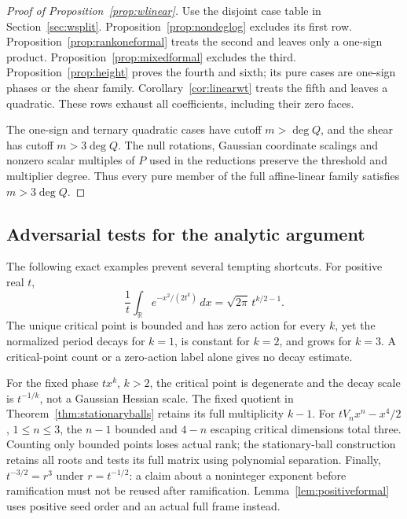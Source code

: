 \begin{proof}[Proof of Proposition~\ref{prop:wlinear}]
Use the disjoint case table in Section~\ref{sec:wsplit}.
Proposition~\ref{prop:nondeglog} excludes its first row.
Proposition~\ref{prop:rankoneformal} treats the second and leaves
only a one-sign product. Proposition~\ref{prop:mixedformal} excludes
the third. Proposition~\ref{prop:height} proves the fourth and sixth;
its pure cases are one-sign phases or the shear family.
Corollary~\ref{cor:linearwt} treats the fifth and leaves a quadratic.
These rows exhaust all coefficients, including their zero faces.

The one-sign and ternary quadratic cases have cutoff $m>\deg Q$,
and the shear has cutoff $m>3\deg Q$. The null rotations,
Gaussian coordinate scalings and nonzero scalar multiples of $P$
used in the reductions preserve the threshold and multiplier degree.
Thus every pure member of the full affine-linear family satisfies
$m>3\deg Q$.
\end{proof}

\subsection{Adversarial tests for the analytic argument}

The following exact examples prevent several tempting shortcuts.
For positive real $t$,
\[
 \frac1t\int_{\mathbb R}e^{-x^2/(2t^k)}\,dx
   =\sqrt{2\pi}\,t^{k/2-1}.
\]
The unique critical point is bounded and has zero action for every
$k$, yet the normalized period decays for $k=1$, is constant for
$k=2$, and grows for $k=3$. A critical-point count or a zero-action
label alone gives no decay estimate.

For the fixed phase $tx^k$, $k>2$, the critical point is degenerate
and the decay scale is $t^{-1/k}$, not a Gaussian Hessian scale.
The fixed quotient in Theorem~\ref{thm:stationaryballs}
retains its full multiplicity $k-1$.
For $tV_nx^n-x^4/2$, $1\leq n\leq3$, the $n-1$ bounded and
$4-n$ escaping critical dimensions total three. Counting only
bounded points loses actual rank; the stationary-ball construction
retains all roots and tests its full matrix using polynomial separation.
Finally, $t^{-3/2}=r^3$ under $r=t^{-1/2}$: a claim about a
noninteger exponent before ramification must not be reused after
ramification. Lemma~\ref{lem:positiveformal} uses positive seed order
and an actual full frame instead.











